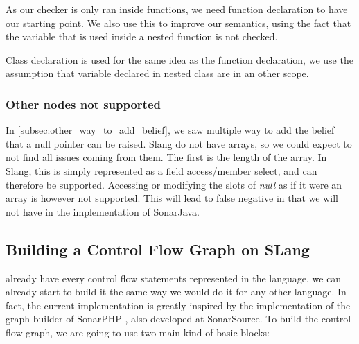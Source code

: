 As our checker is only ran inside functions, we need function declaration to have our starting point. 
We also use this to improve our semantics, using the fact that the variable that is used inside a nested function is not checked.

Class declaration is used for the same idea as the function declaration, we use the assumption that variable declared in nested class are in an other scope.


\subsubsection{Other nodes not supported}
\label{subsubsec:other_nodes_not_supported}

In \ref{subsec:other_way_to_add_belief}, we saw multiple way to add the belief that a null pointer can be raised. 
Slang do not have arrays, so we could expect to not find all issues coming from them. 
The first is the length of the array. In Slang, this is simply represented as a field access/member select, and can therefore be supported. 
Accessing or modifying the slots of \emph{null} as if it were an array is however not supported. This will lead to false negative in \slang that we will not have in the implementation of SonarJava.

\subsection{Building a Control Flow Graph on SLang}
\label{subsec:cfg_on_slang}

\slang already have every control flow statements represented in the language, we can already start to build it the same way we would do it for any other language. 
In fact, the current implementation is greatly inspired by the implementation of the graph builder of SonarPHP \cite{SonarPHP:2019:Online}, also developed at SonarSource. 
To build the control flow graph, we are going to use two main kind of basic blocks:


